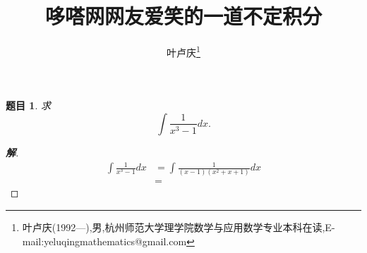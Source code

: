 \documentclass[a4paper]{article}
\newtheorem*{exe}{题目}
\newenvironment{exercise}
{\bigskip\begin{mdframed}\begin{exe}}
    {\end{exe}\end{mdframed}\bigskip}
\begin{document}
\title{\huge{\bf{哆嗒网网友爱笑的一道不定积分}}} \author{\small{叶卢庆\footnote{叶卢庆(1992---),男,杭州师范大学理学院数学与应用数学专业本科在读,E-mail:yeluqingmathematics@gmail.com}}}
\maketitlec
\begin{exercise}
  求
$$
\int \frac{1}{x^3-1}dx.
$$
\end{exercise}
\begin{proof}[\textbf{解}]
  \begin{align*}
    \int \frac{1}{x^3-1}dx&=\int \frac{1}{(x-1)(x^2+x+1)}dx
\\&=
  \end{align*}
\end{proof}
\end{document}
